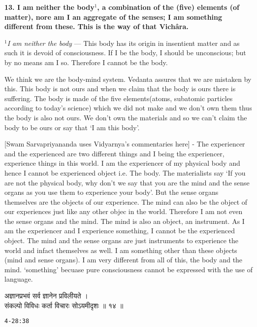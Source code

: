\documentclass{article}
\begin{document}
\textbf{ 13. I am neither the body$^1$, a combination of the (five) elements
(of matter), nore am I an aggregate of the senses; I am something different
from these. This is the way of that Vichâra.  }

{\small\textit{$^1$I am neither the body} --- This body has its origin in
insentient matter and as such it is devoid of consciousness. If I be the body,
I should be unconscious; but by no means am I so. Therefore I cannot be the
body.}

\begin{oframed}

We think we are the body-mind system. Vedanta assures that we are mistaken by
this.  This body is not ours and when we claim that the body is ours there
is suffering. The body is made of the five elements(atoms, subatomic
particles according to  today's science) which we did not make and we don't
own them thus the body is also not ours. We don't own the materials and so
we can't claim the body to be ours or say that `I am this body'.

[Swam Sarvapriyananda uses Vidyarnya's commentaries here] - The experiencer
and the experienced are two different things and I being the experiencer,
experience things in this world. I am the experiencer of my physical body
and hence I cannot be experienced object i.e. The body.  The materialists
say `If you are not the physical body, why don't we say that you are the
mind and the sense organs as you use them to experience your body'. But the
sense organs themselves are the objects of our experience.  The mind can
also be the object of our experiences just like any other objec in the
world. Therefore I am not even the sense organs and the mind.  The mind is
also an object, an instrument. As I am the experiencer and I experience
something, I cannot be the experienced object.  The mind and the sense
organs are just instruments to experience the world and infact themselves
as well. I am something other than these objects (mind and sense organs). I
am very different from all of this, the body and the mind. `something'
becuase pure consciousness cannot be expressed with the use of language.

\end{oframed}


\bigskip

\begin{large}
\begin{center}
    \begin{hindi}
    अज्ञानप्रभवं सर्व ज्ञानेन प्रविलीयते ।\\
    संकल्पो विविधः कर्ता विचारः सोऽयमीदृशः ॥ १४ ॥
    \end{hindi}
\end{center}
\end{large}
\texttt{4-28:38}
\end{document}
